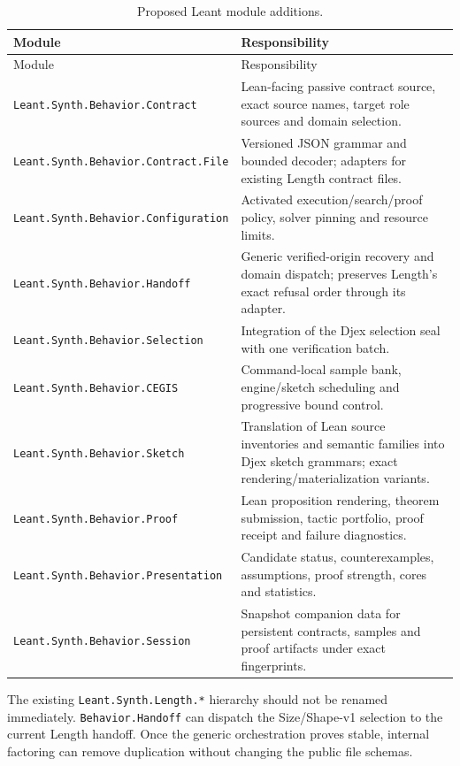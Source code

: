 \documentclass[11pt,oneside]{report}
\newcommand{\code}[1]{\texttt{#1}}
\begin{document}
\begin{longtable}{@{}L{0.43\textwidth}L{0.51\textwidth}@{}}
\caption{Proposed Leant module additions.}\label{tab:leant-modules}\\
\toprule
Module & Responsibility \\
\midrule
\endfirsthead
\toprule
Module & Responsibility \\
\midrule
\endhead
\bottomrule
\endfoot
\code{Leant.Synth.Behavior.Contract} & Lean-facing passive contract source, exact source names, target role sources and domain selection. \\
\code{Leant.Synth.Behavior.Contract.File} & Versioned JSON grammar and bounded decoder; adapters for existing Length contract files. \\
\code{Leant.Synth.Behavior.Configuration} & Activated execution/search/proof policy, solver pinning and resource limits. \\
\code{Leant.Synth.Behavior.Handoff} & Generic verified-origin recovery and domain dispatch; preserves Length's exact refusal order through its adapter. \\
\code{Leant.Synth.Behavior.Selection} & Integration of the Djex selection seal with one verification batch. \\
\code{Leant.Synth.Behavior.CEGIS} & Command-local sample bank, engine/sketch scheduling and progressive bound control. \\
\code{Leant.Synth.Behavior.Sketch} & Translation of Lean source inventories and semantic families into Djex sketch grammars; exact rendering/materialization variants. \\
\code{Leant.Synth.Behavior.Proof} & Lean proposition rendering, theorem submission, tactic portfolio, proof receipt and failure diagnostics. \\
\code{Leant.Synth.Behavior.Presentation} & Candidate status, counterexamples, assumptions, proof strength, cores and statistics. \\
\code{Leant.Synth.Behavior.Session} & Snapshot companion data for persistent contracts, samples and proof artifacts under exact fingerprints. \\
\end{longtable}

The existing \code{Leant.Synth.Length.*} hierarchy should not be renamed immediately. \code{Behavior.Handoff} can dispatch the Size/Shape-v1 selection to the current Length handoff. Once the generic orchestration proves stable, internal factoring can remove duplication without changing the public file schemas.
\end{document}
